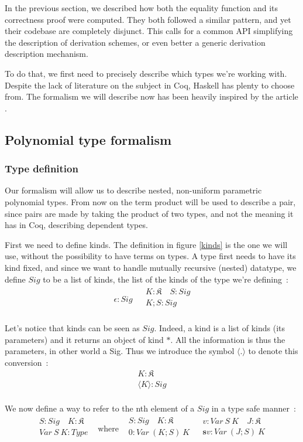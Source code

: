 \documentclass{article}
\newcommand{\msig}[1]{\langle {#1} \rangle}
\newcommand{\K}{\mathfrak{K}}
\newcommand{\suc}{\mathbf{s}}
\newcommand{\irule}[2]{\begin{array}{c} {#1} \\\hline {#2}\\ \end{array}}
\begin{document}
In the previous section, we described how both the equality function and its
correctness proof were computed. They both followed a similar pattern, and
yet their codebase are completely disjunct. This calls for a common API
simplifying the description of derivation schemes, or even better a generic
derivation description mechanism.

To do that, we first need to precisely describe which types we're working with.
Despite the lack of literature on the subject in Coq, Haskell has plenty to
choose from. The formalism we will describe now has been heavily inspired by
the article \cite{genDep}.

\subsection{Polynomial type formalism}

\subsubsection{Type definition}

Our formalism will allow us to describe nested, non-uniform parametric
polynomial types. From now on the term product will be used to describe a pair,
since pairs are made by taking the product of two types, and not the meaning
it has in Coq, describing dependent types.

First we need to define kinds. The definition in figure \ref{kinds} is the
one we will use, without the possibility to have terms on types. A type
first needs to have its kind fixed, and since we want to handle mutually recursive
(nested) datatype, we define $Sig$ to be a list of kinds, the list of the kinds
of the type we're defining~:
\[\begin{array}{cc}
    \irule{}{\epsilon : Sig} & \irule{K : \K\quad S : Sig}{K;S : Sig}
\end{array}\]

Let's notice that kinds can be seen as $Sig$. Indeed, a kind is a list of kinds
(its parameters) and it returns an object of kind  $*$. All the information is
thus the parameters, in other world a Sig. Thus we introduce the symbol $\msig{.}$
to denote this conversion~:
\[\irule{K : \K}{\msig{K} : Sig}\]

We now define a way to refer to the nth element of a $Sig$ in a type safe
manner~:
\[\begin{array}{cccc}
      \irule{S : Sig\quad K : \K}{Var\ S\ K : Type}
    & \text{where}
    & \irule{S : Sig\quad K : \K}{0 : Var\ (K;S)\ K}
    & \irule{v : Var\ S\ K\quad J : \K}{\suc v : Var\ (J;S)\ K} \\
\end{array}\]
\end{document}
